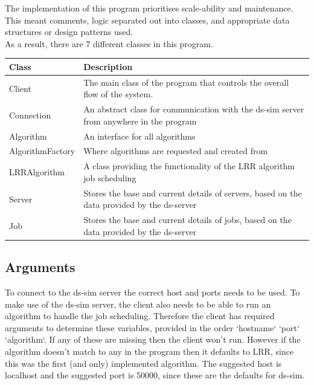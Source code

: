 The implementation of this program prioritises scale-ability and maintenance. This meant comments, logic separated out into classes, and appropriate data structures or design patterns used. \\

\vspace{.2cm}
As a result, there are 7 different classes in this program. \\

\begin{table}[!ht]
    \centering
    \begin{tabular}{l p{12cm}} \midrule
        \textbf{Class} & \textbf{Description} \\ \midrule
        Client & The main class of the program that controls the overall flow of the system. \\ \midrule
        Connection & An abstract class for communication with the ds-sim server from anywhere in the program \\ \midrule
        Algorithm & An interface for all algorithms \\ \midrule
        AlgorithmFactory & Where algorithms are requested and created from \\ \midrule
        LRRAlgorithm & A class providing the functionality of the LRR algorithm job scheduling \\ \midrule
        Server & Stores the base and current details of servers, based on the data provided by the ds-server \\ \midrule
        Job & Stores the base and current details of jobs, based on the data provided by the ds-server \\ \midrule
    \end{tabular}
\end{table}

\subsection{Arguments}
To connect to the ds-sim server the correct host and ports needs to be used. To make use of the ds-sim server, the client also needs to be able to run an algorithm to handle the job scheduling. Therefore the client has required arguments to determine these variables, provided in the order `hostname` `port` `algorithm`. If any of these are missing then the client won't run. However if the algorithm doesn't match to any in the program then it defaults to LRR, since this was the first (and only) implemented algorithm. The suggested host is localhost and the suggested port is 50000, since these are the defaults for ds-sim.


